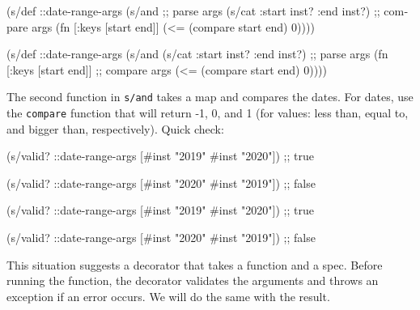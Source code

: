 \ifx\DEVICETYPE\MOBILE

\begin{english}
  \begin{clojure}
(s/def ::date-range-args
  (s/and
    ;; parse args
    (s/cat :start inst? :end inst?)
    ;; compare args
    (fn [{:keys [start end]}]
      (<= (compare start end) 0))))
  \end{clojure}
\end{english}

\else

\begin{english}
  \begin{clojure}
(s/def ::date-range-args
  (s/and
   (s/cat :start inst? :end inst?) ;; parse args
   (fn [{:keys [start end]}]       ;; compare args
     (<= (compare start end) 0))))
  \end{clojure}
\end{english}

\fi


The second function in \verb|s/and| takes a map and compares the dates. For dates, use the \verb|compare| function that will return -1, 0, and 1 (for values: less than, equal to, and bigger than, respectively). Quick check:

\ifx\DEVICETYPE\MOBILE

\begin{english}
  \begin{clojure}
(s/valid? ::date-range-args
          [#inst "2019" #inst "2020"])
;; true

(s/valid? ::date-range-args
          [#inst "2020" #inst "2019"])
;; false
  \end{clojure}
\end{english}

\else

\begin{english}
  \begin{clojure}
(s/valid? ::date-range-args
          [#inst "2019" #inst "2020"]) ;; true

(s/valid? ::date-range-args
          [#inst "2020" #inst "2019"]) ;; false
  \end{clojure}
\end{english}

\fi


This situation suggests a decorator that takes a function and a spec. Before running the function, the decorator validates the arguments and throws an exception if an error occurs. We will do the same with the result.

